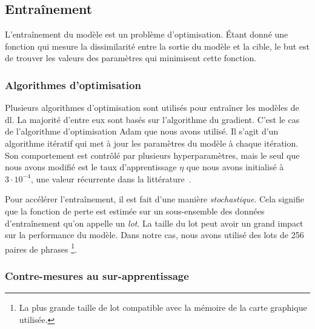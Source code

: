 \subsection{Entraînement}

L'entraînement du modèle est un problème d'optimisation.
Étant donné une fonction qui mesure la dissimilarité entre la sortie du modèle et la cible,
le but est de trouver les valeurs des paramètres qui minimisent cette fonction.

\subsubsection{Algorithmes d'optimisation}

Plusieurs algorithmes d'optimisation sont utilisés pour entraîner les modèles de \gls{dl}.
La majorité d'entre eux sont basés sur l'algorithme du gradient.
C'est le cas de l'algorithme d'optimisation Adam \cite{Kingma_Ba_2017} que nous avons utilisé.
Il s'agit d'un algorithme itératif qui met à jour les paramètres du modèle à chaque itération.
Son comportement est contrôlé par plusieurs hyperparamètres,
mais le seul que nous avons modifié est le taux d'apprentissage \(\eta\) que nous avons initialisé à
\(3\cdot 10^{-4}\), une valeur récurrente dans la littérature~\cite{islam2022face,lu2023deformable}.

Pour accélérer l'entraînement, il est fait d'une manière \emph{stochastique}.
Cela signifie que la fonction de perte est estimée 
sur un sous-ensemble des données d'entraînement qu'on appelle un \emph{lot}.
La taille du lot peut avoir un grand impact sur la performance du modèle.
Dans notre cas, nous avons utilisé des lots de 256 paires de phrases%
\footnote{%
  La plus grande taille de lot compatible avec la mémoire de la carte graphique utilisée.
}.


\subsubsection{Contre-mesures au sur-apprentissage}

